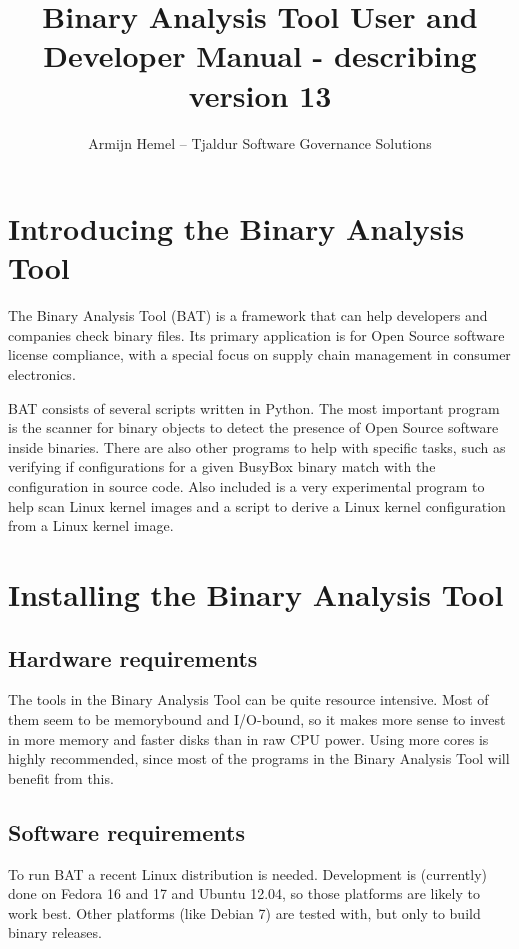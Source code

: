 \documentclass[10pt]{article}
\author{Armijn Hemel -- Tjaldur Software Governance Solutions}
\title{Binary Analysis Tool User and Developer Manual - describing version 13}
\begin{document}
\maketitle
\thispagestyle{empty}

\section{Introducing the Binary Analysis Tool}

The Binary Analysis Tool (BAT) is a framework that can help developers and
companies check binary files. Its primary application is for Open Source
software license compliance, with a special focus on supply chain management
in consumer electronics.

BAT consists of several scripts written in Python. The most important program
is the scanner for binary objects to detect the presence of Open Source
software inside binaries. There are also other programs to help with specific
tasks, such as verifying if configurations for a given BusyBox binary match
with the configuration in source code. Also included is a very experimental
program to help scan Linux kernel images and a script to derive a Linux kernel
configuration from a Linux kernel image.

\section{Installing the Binary Analysis Tool}

\subsection{Hardware requirements}

The tools in the Binary Analysis Tool can be quite resource intensive. Most of
them seem to be memorybound and I/O-bound, so it makes more sense to invest
in more memory and faster disks than in raw CPU power. Using more cores is
highly recommended, since most of the programs in the Binary Analysis Tool will
benefit from this.

\subsection{Software requirements}

To run BAT a recent Linux distribution is needed. Development is (currently)
done on Fedora 16 and 17 and Ubuntu 12.04, so those platforms are likely to
work best. Other platforms (like Debian 7) are tested with, but only to
build binary releases.
\end{document}
